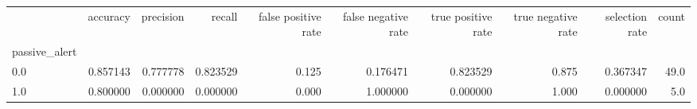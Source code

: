 \begin{tabular}{lrrrrrrrrr}
\toprule
{} &  accuracy &  precision &    recall &  false positive rate &  false negative rate &  true positive rate &  true negative rate &  selection rate &  count \\
passive\_alert &           &            &           &                      &                      &                     &                     &                 &        \\
\midrule
0.0           &  0.857143 &   0.777778 &  0.823529 &                0.125 &             0.176471 &            0.823529 &               0.875 &        0.367347 &   49.0 \\
1.0           &  0.800000 &   0.000000 &  0.000000 &                0.000 &             1.000000 &            0.000000 &               1.000 &        0.000000 &    5.0 \\
\bottomrule
\end{tabular}

